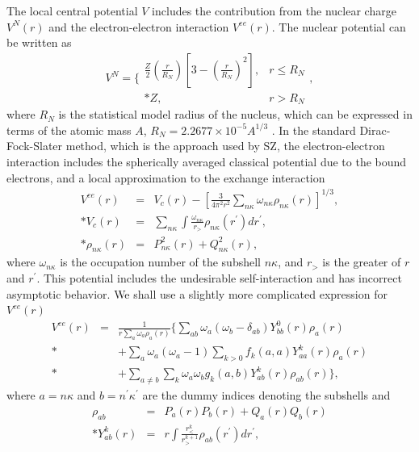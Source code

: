 \documentclass[preprint, floatfix, pra, showpacs, showkeys]{revtex4}
\begin{document}
The local central potential $V$ includes the contribution from the nuclear
charge $V^N(r)$ and the electron-electron interaction $V^{ee}(r)$. The nuclear
potential can be written as
\begin{equation}
\label{eq_nuclear}
V^{N} = \Bigg\{\begin{array}{ll}
\frac{Z}{2}\left(\frac{r}{R_N}\right)
\left[3-\left(\frac{r}{R_N}\right)^2\right], & r \le R_N \nonumber\\*
Z, & r > R_N
\end{array},
\end{equation}
where $R_N$ is the statistical model radius of the nucleus, which can be
expressed in terms of the atomic mass $A$, $R_N = 2.2677\times 10^{-5}
A^{1/3}$ \cite{chernysheva99}. In the standard Dirac-Fock-Slater method, which
is the approach used by SZ, the electron-electron interaction includes the
spherically averaged 
classical potential due to the bound electrons, and a local approximation to
the exchange interaction
\begin{eqnarray}
\label{eq_ee}
V^{ee}(r) &=& V_c(r) - \left[\frac{3}{4\pi^2 r^2}\sum_{n\kappa}
\omega_{n\kappa}\rho_{n\kappa}(r)\right]^{1/3}, \nonumber\\*
V_c(r) &=& \sum_{n\kappa}\int \frac{\omega_{n\kappa}}{r_>}
\rho_{n\kappa}(r^\prime)d r^{\prime}, \nonumber\\*
\rho_{n\kappa}(r) &=& P_{n\kappa}^2(r) + Q_{n\kappa}^2(r), 
\end{eqnarray}
where $\omega_{n\kappa}$ is the occupation number of the subshell
$n\kappa$, and $r_>$ is the greater of $r$ and $r^{\prime}$. This potential
includes the undesirable self-interaction and has incorrect asymptotic
behavior. We shall use a slightly more complicated expression for $V^{ee}(r)$
\begin{eqnarray}
\label{eq_nee}
V^{ee}(r) &=& \frac{1}{r\sum_a
\omega_a\rho_a(r)}\Big\{\sum_{ab}\omega_a(\omega_b -
\delta_{ab})Y^0_{bb}(r)\rho_a(r) \nonumber\\*
&&+\sum_a\omega_a(\omega_a-1)\sum_{k>0}f_{k}(a,a)Y^{k}_{aa}(r)\rho_a(r) 
\nonumber\\*
&&+\sum_{a\ne b} \sum_k \omega_a\omega_b 
g_{k}(a,b) Y^{k}_{ab}(r)\rho_{ab}(r)\Big\},
\end{eqnarray}
where $a = n\kappa$ and $b = n^\prime\kappa^\prime$ are the dummy indices
denoting the subshells and 
\begin{eqnarray}
\label{eq_yk} 
\rho_{ab} &=& P_a(r)P_b(r) + Q_a(r)Q_b(r) \nonumber\\*
Y^k_{ab}(r) &=& r\int\frac{r_<^k}{r_>^{k+1}}\rho_{ab}(r^\prime)d r^\prime,
\end{eqnarray}
\end{document}
